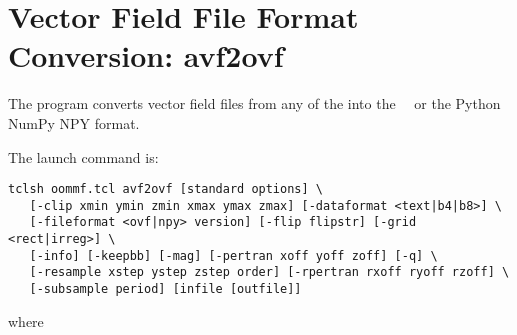 
\section{Vector Field File Format Conversion:
          avf2ovf}\label{sec:avf2ovf}%
%
The  program converts vector field files from any of the
\HTMLoutput{ (\OVF, \VIO)}
into the \OOMMF\ \OVF\ or the Python NumPy NPY format.

The  launch command is:
\begin{verbatim}
tclsh oommf.tcl avf2ovf [standard options] \
   [-clip xmin ymin zmin xmax ymax zmax] [-dataformat <text|b4|b8>] \
   [-fileformat <ovf|npy> version] [-flip flipstr] [-grid <rect|irreg>] \
   [-info] [-keepbb] [-mag] [-pertran xoff yoff zoff] [-q] \
   [-resample xstep ystep zstep order] [-rpertran rxoff ryoff rzoff] \
   [-subsample period] [infile [outfile]]
\end{verbatim}
where
